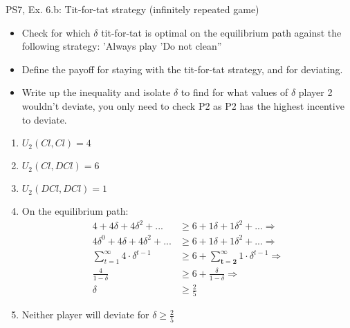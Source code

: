 \begin{frame}{PS7, Ex. 6.b: Tit-for-tat strategy (infinitely repeated game)}
    \begin{itemize}
    \item[(b)] Check for which $\delta$ tit-for-tat is optimal on the equilibrium path against the following strategy: ’Always play ’Do not clean”
    \end{itemize}
  \begin{multicols}{2}
  \begin{itemize}
      \item[(Step a)] Define the payoff for staying with the tit-for-tat strategy, and for deviating.
      \item[(Step b)] Write up the inequality and isolate $\delta$ to find for what values of $\delta$ player 2 wouldn't deviate, you only need to check P2 as P2 has the highest incentive to deviate.
  \end{itemize}
    \vfill\null\columnbreak
    \begin{enumerate}
        \item $U_2(Cl,Cl) = 4$
        \item $U_2(Cl,DCl) = 6$
        \item $U_2(DCl,DCl) = 1$
        \item On the equilibrium path:
        \begin{align*}
            4+4\delta+4\delta^2+...&\geq6+1\delta+1\delta^2+...\Rightarrow\\
            4\delta^0+4\delta+4\delta^2+...&\geq6+1\delta+1\delta^2+...\Rightarrow\\
            \sum_{t=1}^{\infty} 4\cdot\delta^{t-1}&\geq6 + \sum_{\bm{t=2}}^{\infty} 1\cdot\delta^{t-1}\Rightarrow\\
            \frac{4}{1-\delta} &\geq 6 + \frac{\delta}{1-\delta}\Rightarrow\\
            \delta &\geq \frac{2}{5}
        \end{align*}
        \item Neither player will deviate for $\delta \geq \frac{2}{5}$
    \end{enumerate}
    \vfill\null
  \end{multicols}
\end{frame}


